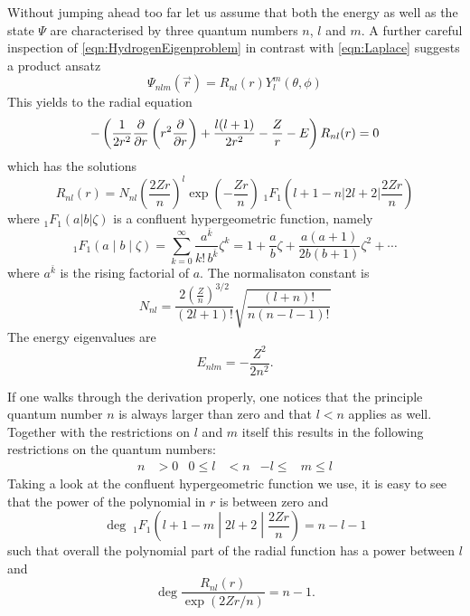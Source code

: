 Without jumping ahead too far let us assume that both the energy as well
as the state $\Psi$ are characterised by three quantum numbers $n$, $l$ and $m$.
A further careful inspection of \eqref{eqn:HydrogenEigenproblem}
in contrast with \eqref{eqn:Laplace} suggests a product ansatz
\[ \Psi_{nlm}(\vec{r}) = R_{nl}(r) Y_l^m(\theta, \phi) \]
This yields to the radial equation
\begin{equation}
	- \left( \frac{1}{2r^2} \frac{\partial}{\partial r} \left( r^2 \frac{\partial}{\partial r} \right) + \frac{l (l+1)}{2 r^2} - \frac{Z}{r} - E \right) R_{nl}(r) = 0
	\label{eqn:HydrogenRadial}
\end{equation}
which has the solutions~\cite{Mueller2000}
\begin{equation}
	 R_{nl}(r) = N_{nl} \left(\frac{2Zr}{n}\right)^l \exp\left(-\frac{Zr}{n} \right)
\;_1F_1\left(l+1-n | 2l+2|\frac{2Zr}{n}\right)
	\label{eqn:HydrogenRadialSolution}
\end{equation}
where $_1F_1\left(a|b|\zeta\right)$ is a confluent hypergeometric function,
namely~\cite{Avery2006}
\[ _1F_1\left(a \middle| b \middle| \zeta\right) =
\sum_{k=0}^\infty \frac{a^{\bar{k}}}{k! \, b^{\bar{k}}} \zeta^k =
1 + \frac{a}{b} \zeta + \frac{a(a+1)}{2b(b+1)} \zeta^2 + \cdots \]
where $a^{\bar{k}}$ is the rising factorial of $a$.
The normalisaton constant is
\[ N_{nl} = \frac{2 \left( \frac{Z}{n} \right)^{3/2}}{(2l+1)!} \sqrt{ \frac{(l+n)!}{n (n-l-1)!}} \]
The energy eigenvalues are
\[ E_{nlm} = - \frac{Z^2}{2n^2}. \]

If one walks through the derivation properly,
one notices that the principle quantum number $n$ is always larger than zero
and that $l < n$ applies as well.
Together with the restrictions on $l$ and $m$ itself this results in the
following restrictions on the quantum numbers:
\begin{align*}
	n &> 0 & 0 \leq l &< n & -l \leq &m \leq l
\end{align*}
Taking a look at the confluent hypergeometric function we use, it is easy to see
that the power of the polynomial in $r$ is between zero and
\[
	\deg \;_1F_1\left(l + 1 -m \middle| 2l+2 \middle| \frac{2Zr}{n} \right) = n - l -1 \]
such that overall the polynomial part of the radial function
has a power between $l$ and
\[ \deg \frac{R_{nl}(r)}{\exp(2Zr/n)} = n - 1. \]

